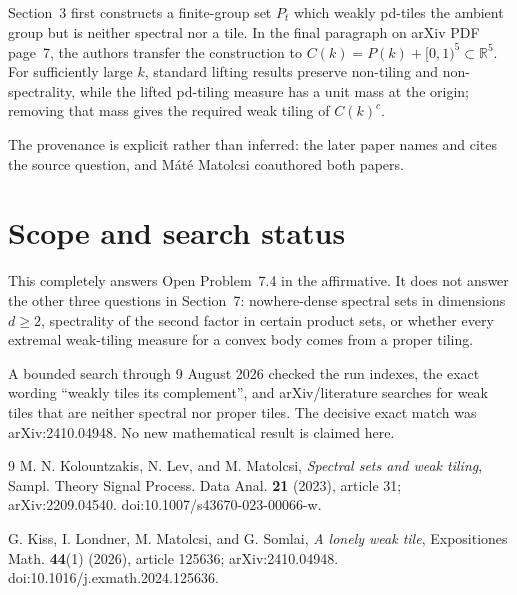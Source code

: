 \documentclass[11pt]{article}
\begin{document}
Section~3 first constructs a finite-group set $P_t$ which weakly pd-tiles
the ambient group but is neither spectral nor a tile.  In the final paragraph
on arXiv PDF page~7, the authors transfer the construction to
$C(k)=P(k)+[0,1)^5\subset\mathbb R^5$.  For sufficiently large $k$, standard
lifting results preserve non-tiling and non-spectrality, while the lifted
pd-tiling measure has a unit mass at the origin; removing that mass gives the
required weak tiling of $C(k)^c$.

The provenance is explicit rather than inferred: the later paper names and
cites the source question, and Máté Matolcsi coauthored both papers.

\section{Scope and search status}

This completely answers Open Problem~7.4 in the affirmative.  It does not
answer the other three questions in Section~7: nowhere-dense spectral sets
in dimensions $d\ge2$, spectrality of the second factor in certain product
sets, or whether every extremal weak-tiling measure for a convex body comes
from a proper tiling.

A bounded search through 9 August 2026 checked the run indexes, the exact
wording ``weakly tiles its complement'', and arXiv/literature searches for
weak tiles that are neither spectral nor proper tiles.  The decisive exact
match was arXiv:2410.04948.  No new mathematical result is claimed here.

\begin{thebibliography}{9}
M. N. Kolountzakis, N. Lev, and M. Matolcsi,
\emph{Spectral sets and weak tiling},
Sampl. Theory Signal Process. Data Anal. \textbf{21} (2023), article 31;
arXiv:2209.04540. doi:10.1007/s43670-023-00066-w.

G. Kiss, I. Londner, M. Matolcsi, and G. Somlai,
\emph{A lonely weak tile},
Expositiones Math. \textbf{44}(1) (2026), article 125636;
arXiv:2410.04948. doi:10.1016/j.exmath.2024.125636.
\end{thebibliography}
\end{document}
